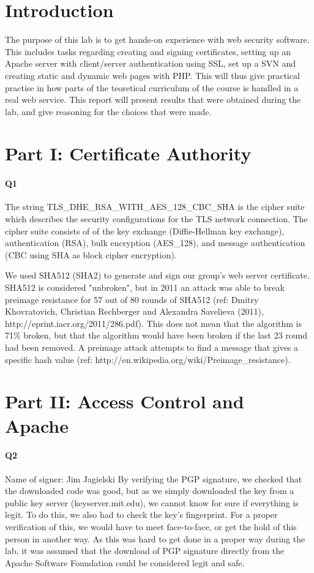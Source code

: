 \documentclass[11pt, a4paper]{article}
\begin{document}
\section{Introduction}
The purpose of this lab is to get hands-on experience with web security software. This includes tasks regarding creating and signing certificates, setting up an Apache server with client/server authentication using SSL, set up a SVN and creating static and dynamic web pages with PHP. This will thus give practical practise in how parts of the teoretical curriculum of the course is handled in a real web service. This report will present results that were obtained during the lab, and give reasoning for the choices that were made. 
\section{Part I: Certificate Authority}
\paragraph{Q1} 
The string TLS\_DHE\_RSA\_WITH\_AES\_128\_CBC\_SHA is the cipher suite which describes the security configurations for the TLS network connection. The cipher suite consists of of the key exchange (Diffie-Hellman key exchange), authentication (RSA), bulk encryption (AES\_128), and message authentication (CBC using SHA as block cipher encryption). 

We used SHA512 (SHA2) to generate and sign our group's web server certificate. SHA512 is considered "unbroken", but in 2011 an attack was able to break preimage resistance  for 57 out of 80 rounds of SHA512 (ref: Dmitry Khovratovich, Christian Rechberger and Alexandra Savelieva (2011), http://eprint.iacr.org/2011/286.pdf). This does not mean that the algorithm is 71\% broken, but that the algorithm would have been broken if the last 23 round had been removed. A preimage attack attempts to find a message that gives a specific hash value (ref: http://en.wikipedia.org/wiki/Preimage\_resistance).

\section{Part II: Access Control and Apache}
\paragraph{Q2}
Name of signer: Jim Jagielski
By verifying the PGP signature, we checked that the downloaded code was good, but as we simply downloaded the key from a public key server (keyserver.mit.edu), we cannot know for sure if everything is legit. To do this, we also had to check the key's fingerprint. For a proper verification of this, we would have to meet face-to-face, or get the hold of this person in another way. As this was hard to get done in a proper way during the lab, it was assumed that the download of PGP signature directly from the Apache Software Foundation could be considered legit and safe.
\end{document}
